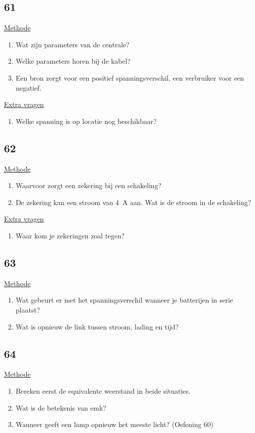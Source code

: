 \subsection*{61}
\underline{Methode}
\begin{enumerate}
	\item Wat zijn parameters van de centrale?
	\item Welke parameters horen bij de kabel?
	\item Een bron zorgt voor een positief spanningsverschil, een verbruiker voor een negatief.
\end{enumerate}

\underline{Extra vragen}
\begin{enumerate}
	\item Welke spanning is op locatie nog beschikbaar?
\end{enumerate}



\subsection*{62}
\underline{Methode}
\begin{enumerate}
	\item Waarvoor zorgt een zekering bij een schakeling?
	\item De zekering kan een stroom van 4~A aan. Wat is de stroom in de schakeling?
\end{enumerate}

\underline{Extra vragen}
\begin{enumerate}
	\item Waar kom je zekeringen zoal tegen?
\end{enumerate}




\subsection*{63}
\underline{Methode}
\begin{enumerate}
	\item Wat gebeurt er met het spanningsverschil wanneer je batterijen in serie plaatst?
	\item Wat is opnieuw de link tussen stroom, lading en tijd? 
\end{enumerate}





\subsection*{64}
\underline{Methode}
\begin{enumerate}
	\item Bereken eerst de equivalente weerstand in beide situaties.
	\item Wat is de betekenis van emk?
	\item Wanneer geeft een lamp opnieuw het meeste licht? (Oefening 60)
\end{enumerate}












